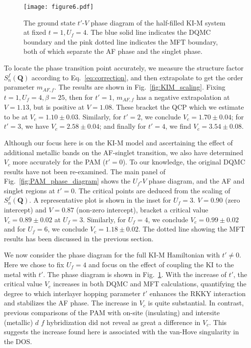 \documentclass[pra,letterpaper,10pt,twocolumn]{revtex4}
\begin{document}
\begin{figure}[!h]
\texttt{[image: figure6.pdf]} 
\caption{
The ground state $t'$-$V$ phase diagram of the half-filled KI-M system
at fixed $t=1,U_f=4$. The blue solid line indicates the DQMC boundary
and the pink dotted line indicates the MFT boundary, both of which
separate the AF phase and the singlet phase.
\label{fig:DQMC_MFT_phase_diagram}
}
\end{figure}

To locate the phase transition point accurately, we measure 
the structure factor $S^f_n(\textbf{Q})$ according to
Eq.~\ref{eq:correction}, and then extrapolate to get the order parameter
$m_{AF,f}$.  The results are shown in Fig.~\ref{fig:KIM_scaling}. Fixing
$t=1, U_f=4, \beta=25$, then for $t'=1$, 
$m_{AF,f}$ has a negative extrapolation at $V=1.13$, but is positive  at
$V=1.08$.  These bracket the QCP which we
estimate to be at  $V_c=1.10\pm 0.03$. Similarly,
for $t'=2$, we conclude $V_c=1.70 \pm 0.04$; for $t'=3$, we have
$V_c=2.58 \pm 0.04$; and finally for $t'=4$,  we find $V_c=3.54 \pm 0.08$.

Although our focus here is on the KI-M model and ascertaining the
effect of additional metallic bands on the AF-singlet transition,
we also have determined $V_c$ more accurately for the PAM ($t'=0$).
To our knowledge, the original DQMC
results\cite{Vekic95} have not been re-examined.
The main panel of
Fig.~\ref{fig:PAM_phase_diagram} shows the $U_f$-$V$ phase diagram,
and the AF and singlet regions at $t'=0$.
The critical points are deduced from the scaling of
$S^f_n(\textbf{Q})$.  A representative plot is
shown in the inset for $U_f=3$. $V=0.90$ (zero intercept) 
and $V=0.87$ (non-zero intercept), bracket a 
critical value $V_c=0.89\pm 0.02$ at $U_f=3$. Similarly, for $U_f=4$, we
conclude $V_c=0.99 \pm 0.02$ and for $U_f=6$, we conclude $V_c=1.18 \pm
0.02$.  The dotted line showing the MFT results has been discussed in
the previous section.

We now consider the phase diagram for the full KI-M Hamiltonian with $t'
\neq 0$.  Here we chose to fix $U_f=4$ and focus on the effect of
coupling the KI to the metal with $t'$.  The phase diagram is shown in
Fig.~\ref{fig:DQMC_MFT_phase_diagram}. With the increase of $t'$, the
critical value $V_c$ increases in both DQMC and MFT calculations,
quantifying the degree to which interlayer hopping parameter $t'$
enhances the RKKY interaction and stabilizes the AF phase.  The increase
in $V_c$ is quite substantial.  In contrast, previous
comparisons\cite{held00} of the PAM with on-site (insulating) and intersite (metallic) $d$ $f$ hybridization did not reveal as great a
difference in $V_c$.  This suggests the increase found here is
associated with the van-Hove singularity in the DOS.
\end{document}
